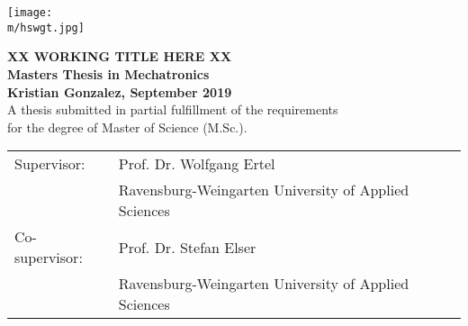 \def \m {../media}
\pagestyle{empty}
\begin{flushright}
\texttt{[image: \\m/hswgt.jpg]}
\end{flushright}

\begin{center}
\vspace*{5cm}

\huge
\textbf{XX WORKING TITLE HERE XX}\\
\Large
\vspace*{2cm}
\noindent \textbf{Masters Thesis in Mechatronics}\\
\vspace*{0.5cm}
\noindent \textbf{Kristian Gonzalez, September 2019}\\
\vspace*{2cm}
\normalsize 
A thesis submitted in partial fulfillment of the requirements\\ for the degree
of Master of Science (M.Sc.).

\end{center}

\vspace*{4.5cm}
\begin{tabular}{ll}
Supervisor: & Prof. Dr. Wolfgang Ertel \\
 & Ravensburg-Weingarten University of Applied Sciences\\
Co-supervisor: & Prof. Dr. Stefan Elser\\
 & Ravensburg-Weingarten University of Applied Sciences\\
\end{tabular}

